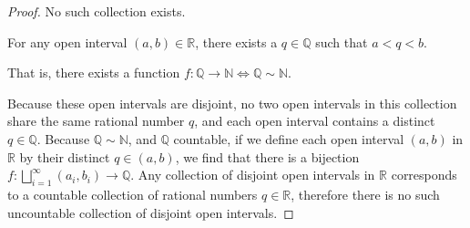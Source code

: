 \documentclass[11pt,twoside, reqno]{amsart}
\theoremstyle{remark}
\def\R{\mathbb R}
\def\Q{\mathbb Q}
\def\N{\mathbb N}
\renewcommand{\iff}{\Leftrightarrow}
\begin{document}
\begin{proof}
No such collection exists.

\newtheorem{Lm}[Lemma]{ Density of $\Q$ in $\R$.} For any open interval $(a,b) \in \R$, there exists a $q \in \Q$ such that $a < q < b$. 

\newtheorem{Lm}[Lemma]{ $\Q$ is countable.} That is, there exists a function $f:\Q \to \N \iff \Q \sim \N$. 

Because these open intervals are disjoint, no two open intervals in this collection share the same rational number $q$, and each open interval contains a distinct $q \in \Q$. Because $\Q \sim \N$, and $\Q$ countable, if we define each open interval $(a,b)$ in $\R$ by their distinct $q \in (a,b)$, we find that there is a bijection $f:\bigsqcup_{i=1}^\infty (a_i,b_i) \to \Q$. Any collection of disjoint open intervals in $\R$ corresponds to a countable collection of rational numbers $q \in \R$, therefore there is no such uncountable collection of disjoint open intervals.
\end{proof}
\end{document}

